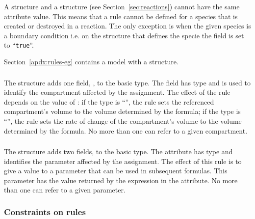 \documentclass[10pt]{cekarticle}
\begin{document}
A  structure and a
 structure (see
Section~\ref{sec:reactions}) cannot have the same 
attribute value.  This means that a rule cannot be defined for a
species that is created or destroyed in a reaction.  The only
exception is when the given species is a boundary condition i.e.
on the  structure that defines the specie the
 field is set to ``\texttt{true}''.

Section~\ref{apdx:rules-eg} contains a model with a
 structure.

\subsubsection{}

The  structure adds one field,
, to the basic  type.
The field  has type  and is used to
identify the compartment affected by the assignment.  The effect
of the rule depends on the value of : if the type is
``'', the rule sets the referenced compartment's
volume to the volume determined by the formula; if the type is
``'', the rule sets the rate of change of the
compartment's volume to the volume determined by the formula. No
more than one  can refer to a given
compartment.

\subsubsection{}

The  structure adds two fields,
 to the basic  type.  The
 attribute has type  and identifies
the parameter affected by the assignment. The effect of this rule
is to give a value to a parameter that can be used in subsequent
formulas.  This parameter has the value returned by the expression
in the  attribute. No more than one
 can refer to a given parameter.

\subsubsection{Constraints on rules}
\label{sec:ruleconstraints}
\end{document}
